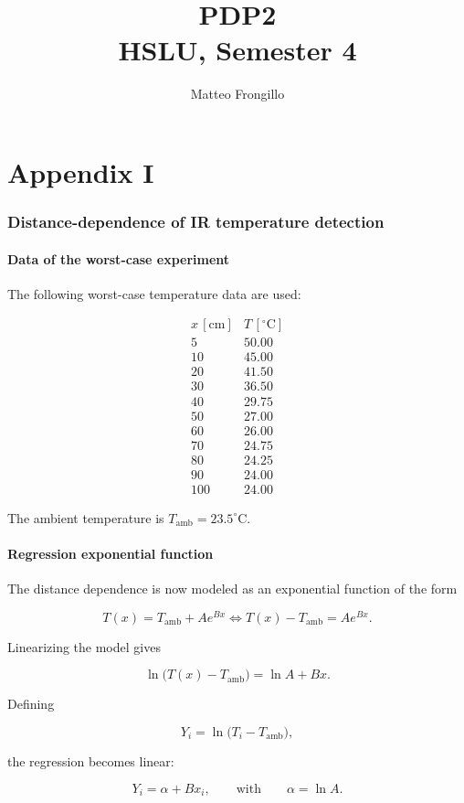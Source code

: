 \documentclass{article}
\title{\textbf{PDP2 \\ HSLU, Semester 4}}
\author{Matteo Frongillo}
\date{}
\begin{document}
\appendix
\renewcommand{\thesection}{I}
\part*{Appendix I}

\section{Distance-dependence of IR temperature detection}

\subsection{Data of the worst-case experiment}
The following worst-case temperature data are used:

\[
\begin{array}{c|c}
x\,[\mathrm{cm}] & T\,[^\circ\mathrm{C}]\\
\hline
5   & 50.00\\
10  & 45.00\\
20  & 41.50\\
30  & 36.50\\
40  & 29.75\\
50  & 27.00\\
60  & 26.00\\
70  & 24.75\\
80  & 24.25\\
90  & 24.00\\
100 & 24.00
\end{array}
\]

The ambient temperature is $T_{\mathrm{amb}}=23.5^\circ\mathrm{C}$.

\subsection{Regression exponential function}
The distance dependence is now modeled as an exponential function of the form

\[
T(x)=T_{\mathrm{amb}}+Ae^{Bx} \Longleftrightarrow T(x)-T_{\mathrm{amb}}=Ae^{Bx}.
\]

Linearizing the model gives

\[
\ln\!\bigl(T(x)-T_{\mathrm{amb}}\bigr)=\ln A+Bx.
\]

Defining

\[
Y_i=\ln\!\bigl(T_i-T_{\mathrm{amb}}\bigr),
\]

the regression becomes linear:

\[
Y_i=\alpha+Bx_i,
\qquad \text{with} \qquad \alpha=\ln A.
\]
\end{document}
